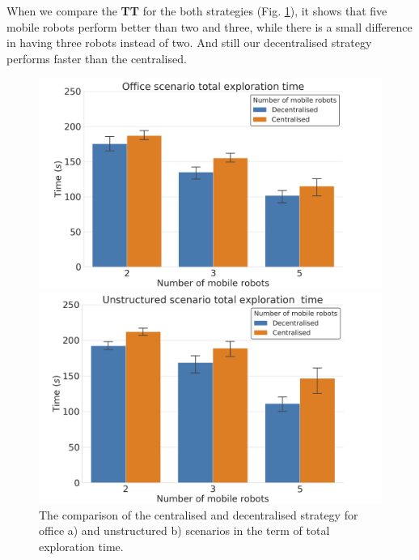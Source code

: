 \documentclass[letterpaper, 10 pt, conference]{ieeeconf}  %
\begin{document}
When we compare the \textbf{TT} for the both strategies (Fig. \ref{fig:tt}), it shows that five mobile robots perform better than two and three, while there is a small difference in having three robots instead of two. And still our decentralised strategy performs faster than the centralised. 

\begin{figure}
	\centering
	\begin{minipage}[c]{0.5\textwidth}
		\centering
		\includegraphics[width=\textwidth]{office_total_e_time.png}
		\captionsetup{labelformat=empty}
		\caption*{}
		\label{fig:office-tt1}
	\end{minipage}%
	\begin{minipage}[c]{0.50\textwidth}
		\centering
		\includegraphics[width=\textwidth]{unstructured_total_e_time.png}
		\captionsetup{labelformat=empty}
		\caption*{}
		\label{fig:office-tt2}
	\end{minipage}
 \caption{The comparison of the centralised and decentralised strategy for office a) and unstructured b) scenarios in the term of total exploration time.}
 \label{fig:tt}
\end{figure}
\end{document}
